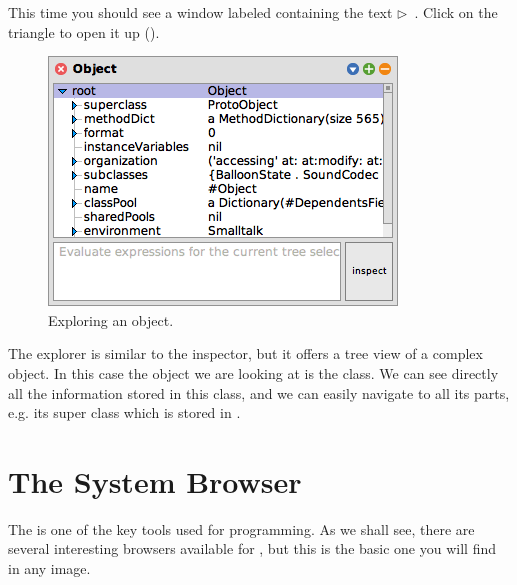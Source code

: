 \documentclass[a4paper,10pt,twoside]{book}
\begin{document}


This time you should see a window labeled  containing the text
\mbox{$\triangleright$ }.
Click on the triangle to open it up ().

\begin{figure}[htb]
\centerline {\includegraphics[scale=0.65]{ExploreIt}}
\caption{Exploring an object. \label{fig:exploreit}}
\end{figure}

The explorer is similar to the inspector, but it offers a tree view of a complex object.
In this case the object we are looking at is the  class.
We can see directly all the information stored in this class, and we can easily navigate to all its parts, e.g. its super class which is stored in .

\section{The System Browser}

The  is one of the key tools used for programming.
As we shall see, there are several interesting browsers available for \sq, but this is the basic one you will find in any image.

\end{document}
